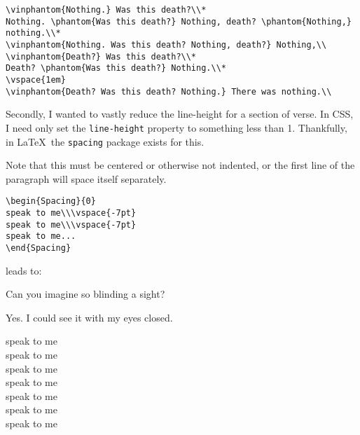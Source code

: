 \begin{paracol}{2}
\begin{leftcolumn}
\begin{verbatim}
\vinphantom{Nothing.} Was this death?\\*
Nothing. \phantom{Was this death?} Nothing, death? \phantom{Nothing,} nothing.\\*
\vinphantom{Nothing. Was this death? Nothing, death?} Nothing,\\
\vinphantom{Death?} Was this death?\\*
Death? \phantom{Was this death?} Nothing.\\*
\vspace{1em}
\vinphantom{Death? Was this death? Nothing.} There was nothing.\\
\end{verbatim}

Secondly, I wanted to vastly reduce the line-height for a section of verse. In CSS, I need only set the \texttt{line-height} property to something less than 1. Thankfully, in \LaTeX\ the \texttt{spacing} package exists for this. 

\end{leftcolumn}
\begin{rightcolumn*}
\noindent Note that this must be centered or otherwise not indented, or the first line of the paragraph will space itself separately.
\end{rightcolumn*}
\begin{leftcolumn}

\begin{verbatim}
\begin{Spacing}{0}
speak to me\\\vspace{-7pt}
speak to me\\\vspace{-7pt}
speak to me...
\end{Spacing}
\end{verbatim}

leads to:

\end{leftcolumn}
\begin{rightcolumn*}
\begin{ally}
  Can you imagine so blinding a sight?
\end{ally}
Yes. I could see it with my eyes closed.
\end{rightcolumn*}
\begin{leftcolumn}
\begin{center}
\begin{Spacing}{0}
speak to me\\\vspace{-7pt}
speak to me\\\vspace{-7pt}
speak to me\\\vspace{-7pt}
speak to me\\\vspace{-7pt}
speak to me\\\vspace{-7pt}
speak to me\\\vspace{-7pt}
speak to me


\end{Spacing}
\end{center}
\end{leftcolumn}
\end{paracol}
